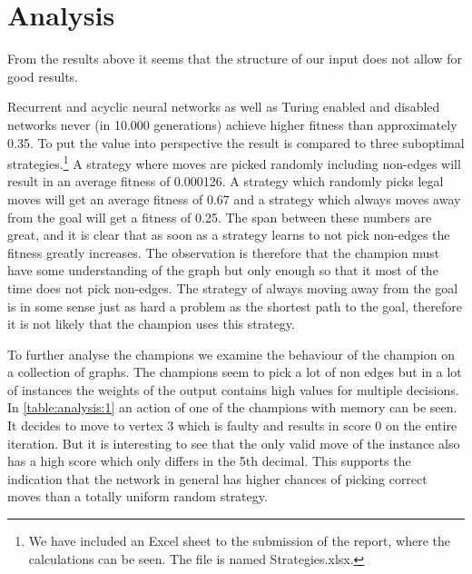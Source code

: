 
\section{Analysis}
From the results above it seems that the structure of our input does not allow for good results.

\newpar Recurrent and acyclic neural networks as well as Turing enabled and disabled networks never (in 10.000 generations) achieve higher fitness than approximately 0.35. To put the value into perspective the result is compared to three suboptimal strategies.\footnote{We have included an Excel sheet to the submission of the report, where the calculations can be seen. The file is named Strategies.xlsx.} A strategy where moves are picked randomly including non-edges will result in an average fitness of 0.000126. A strategy which randomly picks legal moves will get an average fitness of 0.67 and a strategy which always moves away from the goal will get a fitness of 0.25. The span between these numbers are great, and it is clear that as soon as a strategy learns to not pick non-edges the fitness greatly increases. The observation is therefore that the champion must have some understanding of the graph but only enough so that it most of the time does not pick non-edges. The strategy of always moving away from the goal is in some sense just as hard a problem as the shortest path to the goal, therefore it is not likely that the champion uses this strategy. 

\newpar To further analyse the champions we examine the behaviour of the champion on a collection of graphs. The champions seem to pick a lot of non edges but in a lot of instances the weights of the output contains high values for multiple decisions. In \autoref{table:analysis:1} an action of one of the champions with memory can be seen. It decides to move to vertex 3 which is faulty and results in score 0 on the entire iteration. But it is interesting to see that the only valid move of the instance also has a high score which only differs in the 5th decimal. This supports the indication that the network in general has higher chances of picking correct moves than a totally uniform random strategy.

